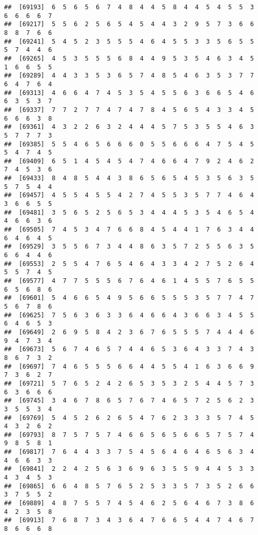 \documentclass[
]{book}
\begin{document}
\begin{verbatim}
##  [69193]  6  5  6  5  6  7  4  8  4  4  5  8  4  4  5  4  5  5  3  6  6  6  6  7
##  [69217]  5  5  6  2  5  6  5  4  5  4  4  3  2  9  5  7  3  6  6  8  8  7  6  6
##  [69241]  5  4  5  2  3  5  5  5  4  6  4  5  5  3  3  5  6  5  5  5  7  4  4  6
##  [69265]  4  5  3  5  5  5  6  8  4  4  9  5  3  5  4  6  3  4  5  1  6  6  5  5
##  [69289]  4  4  3  3  5  3  6  5  7  4  8  5  4  6  3  5  3  7  7  6  4  7  6  4
##  [69313]  4  6  6  4  7  4  5  3  5  4  5  5  6  3  6  6  5  4  6  6  3  5  3  7
##  [69337]  7  7  2  7  7  4  7  4  7  8  4  5  6  5  4  3  3  4  5  6  6  6  3  8
##  [69361]  4  3  2  2  6  3  2  4  4  4  5  7  5  3  5  5  4  6  3  5  7  7  7  3
##  [69385]  5  5  4  6  5  6  6  6  0  5  5  6  6  6  4  7  5  4  5  5  4  7  4  5
##  [69409]  6  5  1  4  5  4  5  4  7  4  6  6  4  7  9  2  4  6  2  7  4  5  3  6
##  [69433]  8  4  8  5  4  4  3  8  6  5  6  5  4  5  3  5  6  3  5  5  7  5  4  4
##  [69457]  4  5  5  4  5  5  4  2  7  4  5  5  3  5  7  7  4  6  4  3  6  6  5  5
##  [69481]  3  5  6  5  2  5  6  5  3  4  4  4  5  3  5  4  6  5  4  4  6  6  3  6
##  [69505]  7  4  5  3  4  7  6  6  8  4  5  4  4  1  7  6  3  4  4  6  4  6  4  5
##  [69529]  3  5  5  6  7  3  4  4  8  6  3  5  7  2  5  5  6  3  5  6  6  4  4  6
##  [69553]  2  5  5  4  7  6  5  4  6  4  3  3  4  2  7  5  2  6  4  5  5  7  4  5
##  [69577]  4  7  7  5  5  5  6  7  6  4  6  1  4  5  5  7  6  5  5  6  5  6  8  6
##  [69601]  5  4  6  6  5  4  9  5  6  6  5  5  5  3  5  7  7  4  7  5  6  7  8  6
##  [69625]  7  5  6  3  6  3  3  6  4  6  6  4  3  6  6  3  4  5  5  6  4  6  5  3
##  [69649]  2  6  9  5  8  4  2  3  6  7  6  5  5  5  7  4  4  4  6  9  4  7  3  4
##  [69673]  5  6  7  4  6  5  7  4  4  6  5  3  6  4  3  3  7  4  3  8  6  7  3  2
##  [69697]  7  4  6  5  5  5  6  6  4  4  5  5  4  1  6  3  6  6  9  7  3  6  2  7
##  [69721]  5  7  6  5  2  4  2  6  5  3  5  3  2  5  4  4  5  7  3  6  3  6  6  6
##  [69745]  3  4  6  7  8  6  5  7  6  7  4  6  5  7  2  5  6  2  3  3  5  5  3  4
##  [69769]  5  4  5  2  6  2  6  5  4  7  6  2  3  3  3  5  7  4  5  4  3  2  6  2
##  [69793]  8  7  5  7  5  7  4  6  6  5  6  5  6  6  5  7  5  7  4  9  8  5  8  1
##  [69817]  7  6  4  4  3  3  7  5  4  5  6  4  6  4  6  5  6  3  4  4  6  6  3  3
##  [69841]  2  2  4  2  5  6  3  6  9  6  3  5  5  9  4  4  5  3  3  4  3  4  5  3
##  [69865]  6  6  4  8  5  7  6  5  2  5  3  3  5  7  3  5  2  6  6  3  7  5  5  2
##  [69889]  4  8  7  5  5  7  4  5  4  6  2  5  6  4  6  7  3  8  6  4  2  3  5  8
##  [69913]  7  6  8  7  3  4  3  6  4  7  6  6  5  4  4  7  4  6  7  8  6  6  6  8

\end{verbatim}
\end{document}
